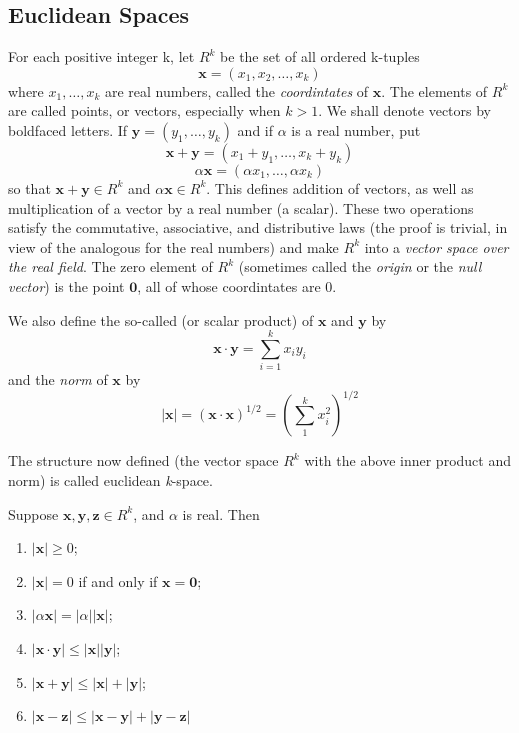 \documentclass[../poma-notes.tex]{subfiles}
\begin{document}
\subsection*{Euclidean Spaces}

\begin{definition}
	For each positive integer k, let $R^k$ be the set of all ordered k-tuples
	\[\mathbf{x}=(x_1,x_2,\dots,x_k)\]
	where $x_1,\dots,x_k$ are real numbers, called the \textit{coordintates} of $\mathbf{x}$. The elements of $R^k$
	are called points, or vectors, especially when $k>1$. We shall denote vectors by boldfaced letters.
	If $\mathbf{y}=(y_1,\dots,y_k)$ and if $\alpha$ is a real number, put
	\[\mathbf{x}+\mathbf{y}=(x_1+y_1,\dots,x_k+y_k)\]
	\[\alpha\mathbf{x}=(\alpha x_1,\dots,\alpha x_k)\]
	so that $\mathbf{x}+\mathbf{y} \in R^k$ and $\alpha\mathbf{x} \in R^k$. This defines addition of vectors,
	as well as multiplication of a vector by a real number (a scalar). These two operations satisfy the commutative,
	associative, and distributive laws (the proof is trivial, in view of the analogous for the real numbers) and
	make $R^k$ into a \textit{vector space over the real field}. The zero element of $R^k$ (sometimes called the
	\textit{origin} or the \textit{null vector}) is the point $\mathbf{0}$, all of whose coordintates are 0.

	We also define the so-called  (or scalar product) of $\mathbf{x}$ and $\mathbf{y}$ by
	\[\mathbf{x}\cdot\mathbf{y}=\sum_{i=1}^{k}x_i y_i\]
	and the \textit{norm} of $\mathbf{x}$ by
	\[|\mathbf{x}| = (\mathbf{x}\cdot\mathbf{x})^{1/2} = \left(\sum_{1}^{k}x^2_i\right)^{1/2}\]

	The structure now defined (the vector space $R^k$ with the above inner product and norm) is called
	euclidean \textit{k}-space.
\end{definition}

\begin{theorem}
	Suppose $\mathbf{x},\mathbf{y},\mathbf{z}\in R^k$, and $\alpha$ is real. Then
	\begin{enumerate}[label=(\alph*)]
		\item $|\mathbf{x}| \ge 0$;
		\item $|\mathbf{x}| = 0$ if and only if $\mathbf{x} = \mathbf{0}$;
		\item $|\alpha\mathbf{x}| = |\alpha||\mathbf{x}|$;
		\item $|\mathbf{x}\cdot\mathbf{y}|\le|\mathbf{x}||\mathbf{y}|$;
		\item $|\mathbf{x}+\mathbf{y}|\le|\mathbf{x}|+|\mathbf{y}|$;
		\item $|\mathbf{x}-\mathbf{z}|\le|\mathbf{x}-\mathbf{y}|+|\mathbf{y}-\mathbf{z}|$
	\end{enumerate}
\end{theorem}
\end{document}
